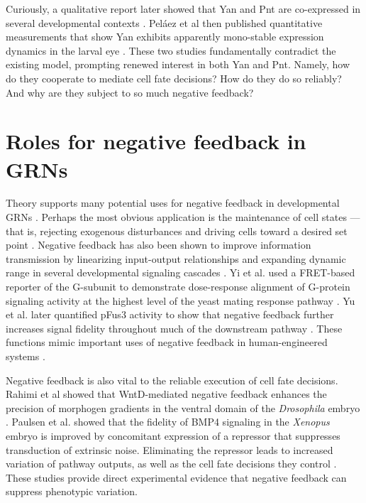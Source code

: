 Curiously, a qualitative report later showed that Yan and Pnt are co-expressed in several developmental contexts \cite{BoisclairLachance2014}. Pel\'{a}ez et al then published quantitative measurements that show Yan exhibits apparently mono-stable expression dynamics in the larval eye \cite{Pelaez2015a}. These two studies fundamentally contradict the existing model, prompting renewed interest in both Yan and Pnt. Namely, how do they cooperate to mediate cell fate decisions? How do they do so reliably? And why are they subject to so much negative feedback?

\section{Roles for negative feedback in GRNs}
 
Theory supports many potential uses for negative feedback in developmental GRNs \cite{Freeman2000}. Perhaps the most obvious application is the maintenance of cell states --- that is, rejecting exogenous disturbances and driving cells toward a desired set point \cite{Alon2007,Behar2007,Yi2000}. Negative feedback has also been shown to improve information transmission by linearizing input-output relationships and expanding dynamic range in several developmental signaling cascades \cite{Bhalla2002,Cheong2011,Paulsen2011,Yi2003,Yu2008a}. Yi et al. used a FRET-based reporter of the G\textalpha-subunit to demonstrate dose-response alignment of G-protein signaling activity at the highest level of the yeast mating response pathway \cite{Yi2003}. Yu et al. later quantified pFus3 activity to show that negative feedback further increases signal fidelity throughout much of the downstream pathway \cite{Yu2008a}. These functions mimic important uses of negative feedback in human-engineered systems \cite{Khammash2016}.

Negative feedback is also vital to the reliable execution of cell fate decisions. Rahimi et al showed that WntD-mediated negative feedback enhances the precision of morphogen gradients in the ventral domain of the \textit{Drosophila} embryo \cite{Rahimi2016}. Paulsen et al. showed that the fidelity of BMP4 signaling in the \textit{Xenopus} embryo is improved by concomitant expression of a repressor that suppresses transduction of extrinsic noise. Eliminating the repressor leads to increased variation of pathway outputs, as well as the cell fate decisions they control \cite{Paulsen2011}. These studies provide direct experimental evidence that negative feedback can suppress phenotypic variation. 

